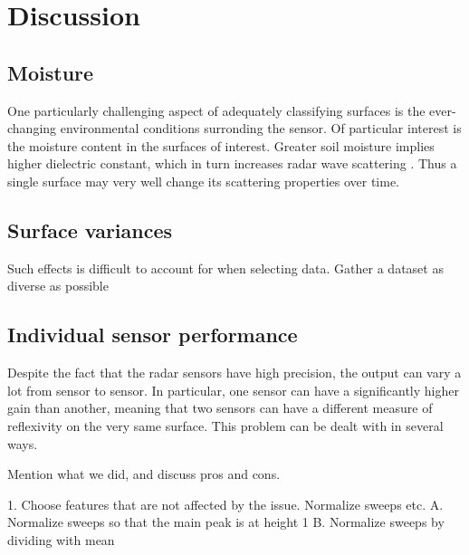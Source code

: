 \chapter{Discussion}


\section{Moisture}

One particularly challenging aspect of adequately classifying surfaces is the ever-changing environmental conditions surronding the sensor. Of particular interest is the moisture content in the surfaces of interest. Greater soil moisture implies higher dielectric constant, which in turn increases radar wave scattering \citep{rappaport_2006}. Thus a single surface may very well change its scattering properties over time. 


\section{Surface variances}

Such effects is difficult to account for when selecting data. Gather a dataset as diverse as possible

\section{Individual sensor performance}
Despite the fact that the radar sensors have high precision, the output can vary a lot from sensor to sensor. In particular, one sensor can have a significantly higher gain than another, meaning that two sensors can have a different measure of reflexivity on the very same surface. This problem can be dealt with in several ways. 

Mention what we did, and discuss pros and cons.

1. Choose features that are not affected by the issue. Normalize sweeps etc.
	A. Normalize sweeps so that the main peak is at height 1
	B. Normalize sweeps by dividing with mean 

